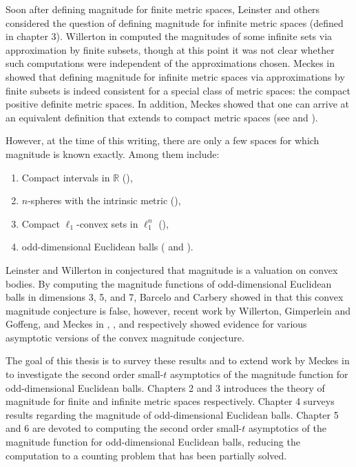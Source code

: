 \documentclass[11pt]{article}
\theoremstyle{mythm}
\begin{document}
Soon after defining magnitude for finite metric spaces, Leinster and others considered the question of defining magnitude for infinite metric spaces (defined in chapter 3). Willerton in \cite{willerton_heuristic_2009} computed the magnitudes of some infinite sets via approximation by finite subsets, though at this point it was not clear whether such computations were independent of the approximations chosen. Meckes in \cite{meckes_positive_2013} showed that defining magnitude for infinite metric spaces via approximations by finite subsets is indeed consistent for a special class of metric spaces: the compact positive definite metric spaces. In addition, Meckes showed that one can arrive at an equivalent definition that extends to compact metric spaces (see \cite{meckes_magnitude_2015} and \cite{leinster_magnitude_2017}).

However, at the time of this writing, there are only a few spaces for which magnitude is known exactly. Among them include:
\begin{enumerate}[label=\arabic*.]
\item Compact intervals in $\mathbb{R}$ (\cite{leinster_magnitude_2017}),
\item $n$-spheres with the intrinsic metric (\cite{willerton_magnitude_2014}),
\item Compact $\ell_1$-convex sets in $\ell_1^n$ (\cite{leinster_magnitude_2017}),
\item odd-dimensional Euclidean balls (\cite{barcelo_magnitudes_2016} and \cite{willerton_magnitude_2017}).
\end{enumerate}

Leinster and Willerton in \cite{leinster_asymptotic_2013} conjectured that magnitude is a valuation on convex bodies. By computing the magnitude functions of odd-dimensional Euclidean balls in dimensions 3, 5, and 7, Barcelo and Carbery showed in \cite{barcelo_magnitudes_2016} that this convex magnitude conjecture is false, however, recent work by Willerton, Gimperlein and Goffeng, and Meckes in \cite{willerton_magnitude_2017}, \cite{gimperlein_magnitude_2017}, and \cite{meckes_magnitude_2019} respectively showed evidence for various asymptotic versions of the convex magnitude conjecture.

The goal of this thesis is to survey these results and to extend work by Meckes in \cite{meckes_magnitude_2019} to investigate the second order small-$t$ asymptotics of the magnitude function for odd-dimensional Euclidean balls. Chapters 2 and 3 introduces the theory of magnitude for finite and infinite metric spaces respectively. Chapter 4 surveys results regarding the magnitude of odd-dimensional Euclidean balls. Chapter 5 and 6 are devoted to computing the second order small-$t$ asymptotics of the magnitude function for odd-dimensional Euclidean balls, reducing the computation to a counting problem that has been partially solved.
\end{document}
